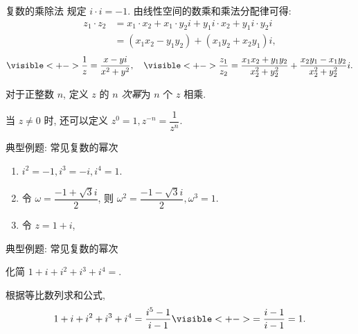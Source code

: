 \begin{frame}{复数的乘除法}
\onslide<+->\alert{规定 $i\cdot i=-1$.}
\onslide<+->由线性空间的数乘和乘法分配律可得:
\onslide<+->
\begin{align*}
z_1\cdot z_2&=x_1\cdot x_2+x_1\cdot y_2i+y_1i\cdot x_2+y_1i\cdot y_2i\\
&=(x_1x_2-y_1y_2)+(x_1y_2+x_2y_1)i,
\end{align*}
\vspace{-\baselineskip}
\[\visible<+->{\frac1{z}=\frac{x-yi}{x^2+y^2}},\quad
\visible<+->{\frac{z_1}{z_2}=\frac{x_1x_2+y_1y_2}{x_2^2+y_2^2}+\frac{x_2y_1-x_1y_2}{x_2^2+y_2^2}i.}\]

\onslide<+->对于正整数 $n$, 定义 $z$ 的 \emph{$n$ 次幂}为 $n$ 个 $z$ 相乘.

\onslide<+->当 $z\neq 0$ 时, 还可以定义 $z^0=1,z^{-n}=\dfrac1{z^n}$.
\end{frame}


\begin{frame}{典型例题: 常见复数的幂次}
\onslide<+->
\begin{example}
\begin{enumerate}
\item $i^2=-1,i^3=-i,i^4=1$.
%
\item 令 $\omega=\dfrac{-1+\sqrt 3i}2$, 则 $\omega^2=\dfrac{-1-\sqrt3i}2,\omega^3=1$.
\item 令 $z=1+i$, 
\vspace{-\baselineskip}
\end{enumerate}
\end{example}
\end{frame}


\begin{frame}{典型例题: 常见复数的幂次}
\onslide<+->
\begin{example}
化简 $1+i+i^2+i^3+i^4=$.
\end{example}
\onslide<+->
\begin{solution}
根据等比数列求和公式,
\[1+i+i^2+i^3+i^4=\frac{i^5-1}{i-1}
\visible<+->{=\frac{i-1}{i-1}=1.}\]
\vspace{-\baselineskip}
\end{solution}
\end{frame}



